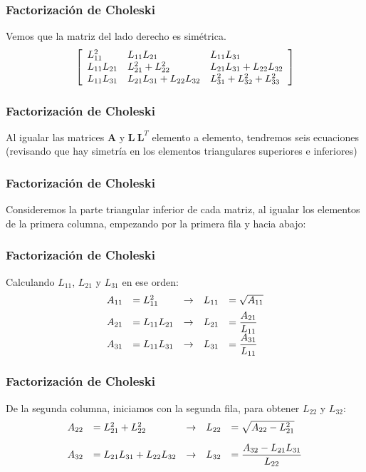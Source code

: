 \documentclass[12pt]{beamer}
\begin{document}
\begin{frame}[fragile]
\frametitle{Factorización de Choleski}
Vemos que la matriz del lado derecho es simétrica.
\fontsize{12}{12}\selectfont
\pause
\begin{align*}
\left[ \begin{array}{l l l}
L_{11}^{2} & L_{11} L_{21} & L_{11} L_{31} \\
L_{11} L_{21} & L_{21}^{2} + L_{22}^{2} & L_{21} L_{31} + L_{22} L_{32} \\
L_{11} L_{31} & L_{21} L_{31} + L_{22} L_{32} & L_{31}^{2} + L_{32}^{2} + L_{33}^{2}
\end{array} \right]
\end{align*}
\end{frame}
\begin{frame}
\frametitle{Factorización de Choleski}
Al igualar las matrices $\mathbf{A}$ y $\mathbf{L \: L}^{T}$ elemento a elemento, tendremos seis ecuaciones (revisando que hay simetría en los elementos triangulares superiores e inferiores)
\end{frame}
\begin{frame}
\frametitle{Factorización de Choleski}
Consideremos la parte triangular inferior de cada matriz, al igualar los elementos de la primera columna, empezando por la primera fila y hacia abajo:
\end{frame}
\begin{frame}
\frametitle{Factorización de Choleski}
Calculando $L_{11}$, $L_{21}$ y $L_{31}$ en ese orden:
\pause
\begin{align*}
\begin{array}{l l l l l}
A_{11} & { = L_{11}^{2}}   & \rightarrow & L_{11} & {= \sqrt{A_{11}}} \\[0.5em]
A_{21} & { = L_{11} L_{21}} & \rightarrow & L_{21} & {= \dfrac{A_{21}}{L_{11}}} \\[0.5em]
A_{31} & { = L_{11} L_{31}} & \rightarrow & L_{31} & {= \dfrac{A_{31}}{L_{11}}}
\end{array}
\end{align*}
\end{frame}
\begin{frame}
\frametitle{Factorización de Choleski}
De la segunda columna, iniciamos con la segunda fila, para obtener $L_{22}$ y $L_{32}$:
\pause
\begin{align*}
\begin{array}{l l l l l}
A_{22} & { = L_{21}^{2} + L_{22}^{2}}   & \rightarrow & L_{22} & { = \sqrt{A_{22} - L_{21}^{2}}} \\[1em]
A_{32} & { = L_{21} L_{31} + L_{22} L_{32}} & \rightarrow & L_{32} & { =\dfrac{A_{32} - L_{21}L_{31}}{L_{22}}} \\
\end{array}
\end{align*}
\end{frame}
\end{document}
